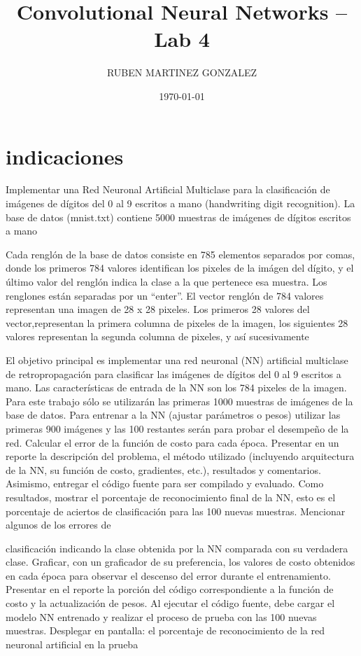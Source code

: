\documentclass{article}
\title{Convolutional Neural Networks – Lab 4}
\author{RUBEN MARTINEZ GONZALEZ}
\date{\today}
\begin{document}
    \maketitle


    \section{indicaciones}\label{sec:indicaciones}
    Implementar una Red Neuronal Artificial Multiclase para la clasificación de imágenes de dígitos
    del 0 al 9 escritos a mano (handwriting digit recognition).
    La base de datos (mnist.txt) contiene 5000 muestras de imágenes de dígitos escritos a mano

    Cada renglón de la base de datos consiste en 785 elementos separados por comas, donde los
    primeros 784 valores identifican los pixeles de la imágen del dígito, y el último valor del renglón
    indica la clase a la que pertenece esa muestra. Los renglones están separadas por un “enter”.
    El vector renglón de 784 valores representan una imagen de 28 x 28 pixeles. Los primeros 28
    valores del vector,representan la primera columna de pixeles de la imagen, los siguientes 28
    valores representan la segunda columna de pixeles, y así sucesivamente

    El objetivo principal es implementar una red neuronal (NN) artificial multiclase de
    retropropagación para clasificar las imágenes de dígitos del 0 al 9 escritos a mano. Las
    características de entrada de la NN son los 784 pixeles de la imagen. Para este trabajo sólo se
    utilizarán las primeras 1000 muestras de imágenes de la base de datos. Para entrenar a la NN
    (ajustar parámetros o pesos) utilizar las primeras 900 imágenes y las 100 restantes serán para
    probar el desempeño de la red. Calcular el error de la función de costo para cada época.
    Presentar en un reporte la descripción del problema, el método utilizado (incluyendo
    arquitectura de la NN, su función de costo, gradientes, etc.), resultados y comentarios.
    Asimismo, entregar el código fuente para ser compilado y evaluado.
    Como resultados, mostrar el porcentaje de reconocimiento final de la NN, esto es el porcentaje
    de aciertos de clasificación para las 100 nuevas muestras. Mencionar algunos de los errores de

    clasificación indicando la clase obtenida por la NN comparada con su verdadera clase. Graficar,
    con un graficador de su preferencia, los valores de costo obtenidos en cada época para observar
    el descenso del error durante el entrenamiento.
    Presentar en el reporte la porción del código correspondiente a la función de costo y la
    actualización de pesos.
    Al ejecutar el código fuente, debe cargar el modelo NN entrenado y realizar el proceso de
    prueba con las 100 nuevas muestras. Desplegar en pantalla: el porcentaje de reconocimiento
    de la red neuronal artificial en la prueba
\end{document}
